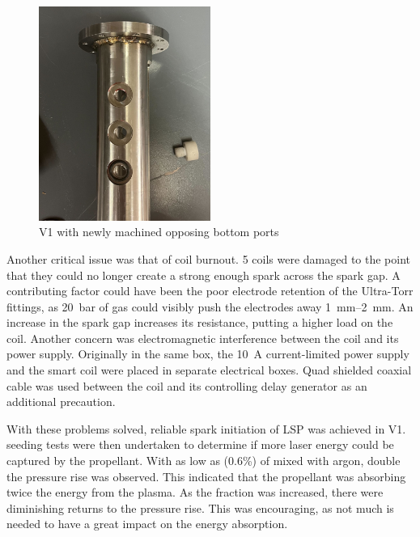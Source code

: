 \begin{figure}[!ht]
    \centering
    \includegraphics[width=0.5\textwidth]{assets/5 discussion/Bottom ports machined.jpg}
    \caption{V1 with newly machined opposing bottom ports}
    \label{fig: V1 opposing ports}
\end{figure}

Another critical issue was that of coil burnout. 5 coils were damaged to the point that they could no longer create a strong enough spark across the spark gap. A contributing factor could have been the poor electrode retention of the Ultra-Torr fittings, as \qty{20}{bar} of gas could visibly push the electrodes away \qtyrange{1}{2}{mm}. An increase in the spark gap increases its resistance, putting a higher load on the coil. Another concern was electromagnetic interference between the coil and its power supply. Originally in the same box, the \qty{10}{A} current-limited power supply and the smart coil were placed in separate electrical boxes. Quad shielded coaxial cable was used between the coil and its controlling delay generator as an additional precaution. 


With these problems solved, reliable spark initiation of LSP was achieved in V1.  seeding tests were then undertaken to determine if more laser energy could be captured by the propellant. With as low as (0.6\%) of  mixed with argon, double the pressure rise was observed. This indicated that the propellant was absorbing twice the energy from the plasma. As the  fraction was increased, there were diminishing returns to the pressure rise. This was encouraging, as not much  is needed to have a great impact on the energy absorption.


